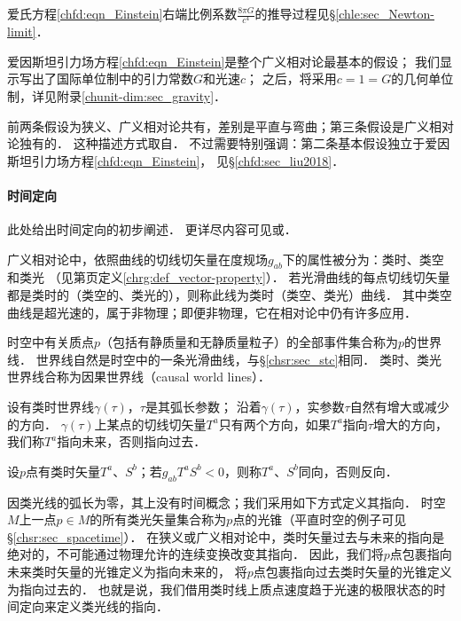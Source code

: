 爱氏方程\eqref{chfd:eqn_Einstein}右端比例系数$\frac{8\pi G}{c^4}$的推导过程见\S\ref{chle:sec_Newton-limit}．


爱因斯坦引力场方程\eqref{chfd:eqn_Einstein}是整个广义相对论最基本的假设；
我们显示写出了国际单位制中的引力常数$G$和光速$c$；
之后，将采用$c=1= G$的几何单位制，详见附录\ref{chunit-dim:sec_gravity}．


\begin{remark}
    前两条假设为狭义、广义相对论共有，差别是平直与弯曲；第三条假设是广义相对论独有的．    
    这种描述方式取自\textcite[Ch.3]{hawking-ellis1973}．
    不过需要特别强调：第二条基本假设独立于爱因斯坦引力场方程\eqref{chfd:eqn_Einstein}，
    见\S\ref{chfd:sec_liu2018}．
\end{remark}


%


\paragraph{时间定向}
此处给出时间定向的初步阐述．
更详尽内容可见\parencite[\S 6.1]{hawking-ellis1973}或\parencite[p.143]{oneill1983}．

广义相对论中，依照曲线的切线切矢量在度规场$g_{ab}$下的属性被分为：类时、类空和类光
（见第\pageref{chrg:def_vector-property}页定义\ref{chrg:def_vector-property}）．
若光滑曲线的每点切线切矢量都是类时的（类空的、类光的），则称此线为类时（类空、类光）曲线．
其中类空曲线是超光速的，属于非物理；即便非物理，它在相对论中仍有许多应用．

时空中有关质点$p$（包括有静质量和无静质量粒子）的全部事件集合称为$p$的{\heiti 世界线}．
世界线自然是时空中的一条光滑曲线，与\S\ref{chsr:sec_stc}相同．
类时、类光世界线合称为{\heiti 因果世界线}（causal world lines）．

设有类时世界线$\gamma(\tau)$，$\tau$是其弧长参数；
沿着$\gamma(\tau)$，实参数$\tau$自然有增大或减少的方向．
$\gamma(\tau)$上某点的切线切矢量$T^a$只有两个方向，如果$T^a$指向$\tau$增大的方向，
我们称$T^a${\heiti 指向未来}，否则{\heiti 指向过去}．

设$p$点有类时矢量$T^a$、$S^b$；若$g_{ab}T^a S^b <0$，则称$T^a$、$S^b${\heiti 同向}，否则{\heiti 反向}．


因类光线的弧长为零，其上没有时间概念；我们采用如下方式定义其指向．
时空$M$上一点$p\in M$的所有类光矢量集合称为$p$点的{\heiti 光锥}（平直时空的例子可见\S\ref{chsr:sec_spacetime}）．
在狭义或广义相对论中，类时矢量过去与未来的指向是绝对的，不可能通过物理允许的连续变换改变其指向．
因此，我们将$p$点包裹指向未来类时矢量的光锥定义为{\heiti 指向未来}的，
将$p$点包裹指向过去类时矢量的光锥定义为{\heiti 指向过去}的．
也就是说，我们借用类时线上质点速度趋于光速的极限状态的时间定向来定义类光线的指向．





